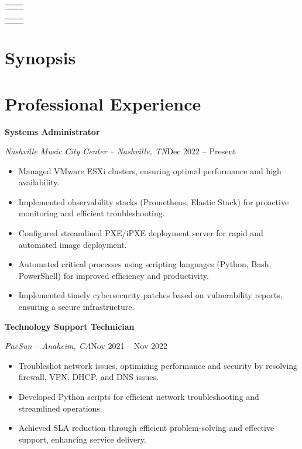 \documentclass[a4paper]{article}
\makeatletter
\renewcommand{\maketitle}{
  \begin{widebox}
    {\bfseries\LARGE\textsf\theauthor} \par
    \medskip{}
    \begin{tabular}{@{}c|c@{}}
        \faIcon{linkedin} \textsf{\applinkedinurl{}} & \faIcon{github} \textsf{\appgithuburl{}}
    \end{tabular} \par
    \begin{tabular}{@{}c|c@{}}
        \faIcon{mobile} \textsf{\appcellphone{}} & \faIcon{envelope} \textsf{\appemail{}}
    \end{tabular} \par
    \medskip{}
    \faIcon{home} \textsf{\appaddress{}}
  \end{widebox}
}
\makeatother
\begin{document}
\author{\textsf{\appfirstname{} \applastname{}}}

\maketitle

\section{Synopsis}

\begin{center}
    \appsynopsis{}
\end{center}

\section{Professional Experience}
\textbf{Systems Administrator}\par
\textit{Nashville Music City Center -- Nashville, TN}\hfill Dec 2022 -- Present

\begin{itemize}[noitemsep,nolistsep]
    \item Managed VMware ESXi clusters, ensuring optimal performance and high availability.
    \item Implemented observability stacks (Prometheus, Elastic Stack) for proactive monitoring and efficient troubleshooting.
    \item Configured streamlined PXE/iPXE deployment server for rapid and automated image deployment.
    \item Automated critical processes using scripting languages (Python, Bash, PowerShell) for improved efficiency and productivity.
    \item Implemented timely cybersecurity patches based on vulnerability reports, ensuring a secure infrastructure.
\end{itemize}

\vspace{0.5em}
\textbf{Technology Support Technician}\par
\textit{PacSun -- Anaheim, CA}\hfill Nov 2021 -- Nov 2022

\begin{itemize}[noitemsep,nolistsep]
    \item Troubleshot network issues, optimizing performance and security by resolving firewall, VPN, DHCP, and DNS issues.
    \item Developed Python scripts for efficient network troubleshooting and streamlined operations.
    \item Achieved SLA reduction through efficient problem-solving and effective support, enhancing service delivery.
\end{itemize}
\end{document}
